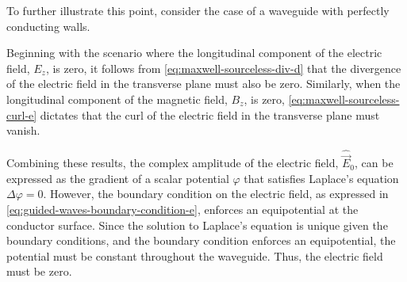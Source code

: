 \documentclass[11pt,a4paper,twoside,openany]{report}
\begin{document}
\begin{remark}
    \label{remark:nonexistence-of-tem-waves-in-hollow-waveguides}
    To further illustrate this point, consider the case of a waveguide with perfectly conducting walls.
    
    Beginning with the scenario where the longitudinal component of the electric field, $E_z$, is zero, it follows from \cref{eq:maxwell-sourceless-div-d} that the divergence of the electric field in the transverse plane must also be zero. Similarly, when the longitudinal component of the magnetic field, $B_z$, is zero, \cref{eq:maxwell-sourceless-curl-e} dictates that the curl of the electric field in the transverse plane must vanish.
    
    Combining these results, the complex amplitude of the electric field, $\hat{\vec E}_0$, can be expressed as the gradient of a scalar potential $\varphi$ that satisfies Laplace's equation $\Delta\varphi = 0$. However, the boundary condition on the electric field, as expressed in \cref{eq:guided-waves-boundary-condition-e}, enforces an equipotential at the conductor surface. Since the solution to Laplace's equation is unique given the boundary conditions, and the boundary condition enforces an equipotential, the potential must be constant throughout the waveguide. Thus, the electric field must be zero.
\end{remark}
\end{document}
